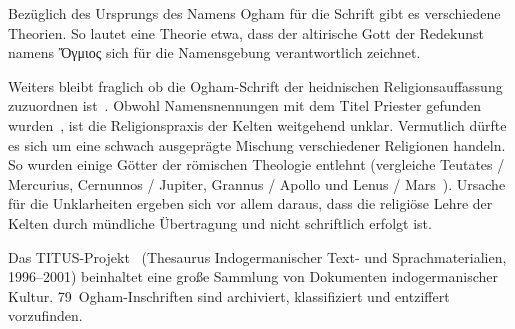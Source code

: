 \documentclass[a4paper]{scrartcl}
\begin{document}
Bezüglich des Ursprungs des Namens Ogham für die Schrift gibt es verschiedene Theorien. So lautet eine Theorie etwa, dass der altirische Gott der Redekunst namens \foreignlanguage{greek}{\ipafont Ὄγμιος} sich für die Namensgebung verantwortlich zeichnet. 

Weiters bleibt fraglich ob die Ogham-Schrift der heidnischen Religionsauffassung zuzuordnen ist~\cite{ogham-heidnisch1,ogham-heidnisch2}. Obwohl Namensnennungen mit dem Titel Priester gefunden wurden~\cite[S. 36]{düwel}, ist die Religionspraxis der Kelten weitgehend unklar. Vermutlich dürfte es sich um eine schwach ausgeprägte Mischung verschiedener Religionen handeln. So wurden einige Götter der römischen Theologie entlehnt (vergleiche Teutates / Mercurius, Cernunnos / Jupiter, Grannus / Apollo und Lenus / Mars~\cite{ogham-religion}). Ursache für die Unklarheiten ergeben sich vor allem daraus, dass die religiöse Lehre der Kelten durch mündliche Übertragung und nicht schriftlich erfolgt ist.

Das TITUS-Projekt~\cite{ogham-titus} (\glqq Thesaurus Indogermanischer Text- und Sprachmaterialien\grqq, 1996--2001) beinhaltet eine große Sammlung von Dokumenten indogermanischer Kultur. 79~Ogham-Inschriften sind archiviert, klassifiziert und entziffert vorzufinden.
\end{document}
